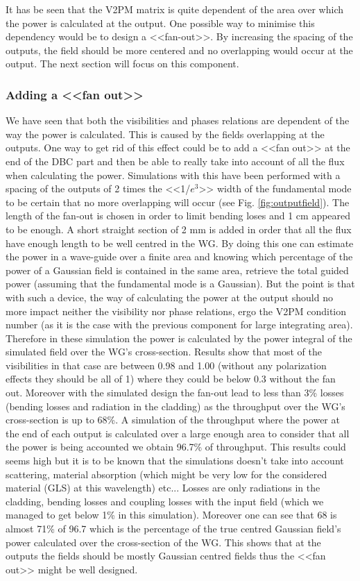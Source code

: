 It has be seen that the V2PM matrix is quite dependent of the area
over which the power is calculated at the output. One possible way to
minimise this dependency would be to design a <<fan-out>>. By
increasing the spacing of the outputs, the field should be more
centered and no overlapping would occur at the output. The next section
will focus on this component.

\subsubsection{Adding a <<fan out>>}
We have seen that both the visibilities and phases relations are
dependent of the way the power is calculated. This is caused by the
fields overlapping at the outputs. One way to get rid of this effect
could be to add a <<fan out>> at the end of the DBC part and then be able to really take into account of all the flux when calculating the power. Simulations
with this have been performed with a spacing of the outputs of 2 times
the <<1/$e^3$>> width of the fundamental mode to be certain that no
more overlapping will occur (see Fig. \ref{fig:outputfield}). The length of the fan-out is chosen in order to limit bending loses and 1 cm appeared to be enough. A short straight section of 2 mm is added in order that all the flux have enough length to be well centred in the WG. By doing this one can estimate the
power in a wave-guide over a finite area and knowing which percentage
of the power of a Gaussian field is contained in the same area,
retrieve the total guided power (assuming that the fundamental mode is a Gaussian). But the point is that with such a
device, the way of calculating the power at the output should no more
impact neither the visibility nor phase relations, ergo the V2PM condition number (as it is the case with the previous component for large integrating area).
Therefore in these simulation the power is calculated by the power
integral of the simulated field over the WG's cross-section.
Results show that most of the visibilities in that case are between
0.98 and 1.00 (without any polarization effects they should be all of
1) where they could be below 0.3 without the fan out.
Moreover with the simulated design the fan-out lead to less than 3\%
losses (bending losses and radiation in the cladding) as the
throughput over the WG's cross-section is up to 68\%.
A simulation of the throughput where the power at the end of each
output is calculated over a large enough area to consider that all the
power is being accounted we obtain 96.7\% of throughput. This results
could seems high but it is to be known that the simulations doesn't
take into account scattering, material absorption (which might be very
low for the considered material (GLS) at this wavelength) etc... Losses are only radiations in
the cladding, bending losses and coupling losses with the input field
(which we managed to get below 1\% in this simulation).
Moreover one can see that 68 is almost 71\% of 96.7 which is the
percentage of the true centred Gaussian field's power calculated over
the cross-section of the WG. This shows that at the outputs the fields
should be mostly Gaussian centred fields thus the <<fan out>> might be well designed.

